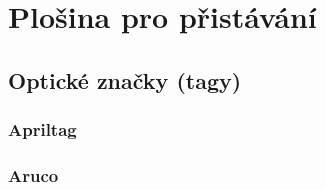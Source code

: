 \chapter{Plošina pro přistávání}
  \section{Optické značky (tagy)}
    \subsection{Apriltag}
    \subsection{Aruco}